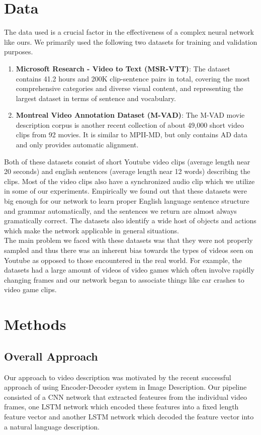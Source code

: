 \documentclass[12pt]{article}
\begin{document}
	\section{Data}
The data used is a crucial factor in the effectiveness of a complex neural network like ours. We primarily used the following two datasets for training and validation purposes.
	\begin{enumerate}
		\item
			\textbf{Microsoft Research - Video to Text (MSR-VTT)}: The dataset contains 41.2 hours and 200K clip-sentence pairs in total, covering the most comprehensive categories and diverse visual content, and representing the largest dataset in terms of sentence and vocabulary.
		\item
			\textbf{Montreal Video Annotation Dataset (M-VAD)}: The M-VAD movie description corpus is another recent collection of about 49,000 short video clips from 92 movies. It is similar to MPII-MD, but only contains AD data and only provides automatic alignment.
		\end{enumerate}
		Both of these datasets consist of short Youtube video clips (average length near 20 seconds) and english sentences (average length near 12 words) describing the clips. Most of the video clips also have a synchronized audio clip which we utilize in some of our experiments. 
		Empirically we found out that these datasets were big enough for our network to learn proper English language sentence structure and grammar automatically, and the sentences we return are almost always gramatically correct. The datasets also identify a wide host of objects and actions which make the network applicable in general situations.\\
		The main problem we faced with these datasets was that they were not properly sampled and thus there was an inherent bias towards the types of videos seen on Youtube as opposed to those encountered in the real world. For example, the datasets had a large amount of videos of video games which often involve rapidly changing frames and our network began to associate things like car crashes to video game clips. 
\section{Methods}
\subsection{Overall Approach}
	Our approach to video description was motivated by the recent successful approach of using Encoder-Decoder system in Image Description.
	Our pipeline consisted of a CNN network that extracted feateures from the individual video frames, one LSTM network which encoded these features into a fixed length feature vector and another LSTM network which decoded the feature vector into a natural language description.
\end{document}
